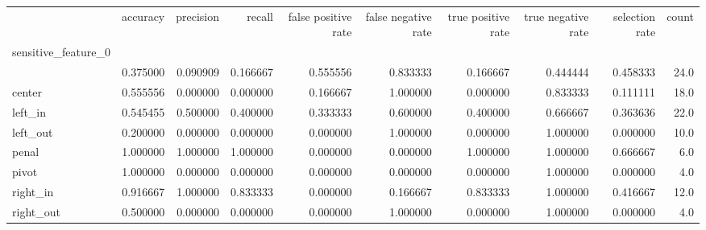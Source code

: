 \begin{tabular}{lrrrrrrrrr}
\toprule
{} &  accuracy &  precision &    recall &  false positive rate &  false negative rate &  true positive rate &  true negative rate &  selection rate &  count \\
sensitive\_feature\_0 &           &            &           &                      &                      &                     &                     &                 &        \\
\midrule
                    &  0.375000 &   0.090909 &  0.166667 &             0.555556 &             0.833333 &            0.166667 &            0.444444 &        0.458333 &   24.0 \\
center              &  0.555556 &   0.000000 &  0.000000 &             0.166667 &             1.000000 &            0.000000 &            0.833333 &        0.111111 &   18.0 \\
left\_in             &  0.545455 &   0.500000 &  0.400000 &             0.333333 &             0.600000 &            0.400000 &            0.666667 &        0.363636 &   22.0 \\
left\_out            &  0.200000 &   0.000000 &  0.000000 &             0.000000 &             1.000000 &            0.000000 &            1.000000 &        0.000000 &   10.0 \\
penal               &  1.000000 &   1.000000 &  1.000000 &             0.000000 &             0.000000 &            1.000000 &            1.000000 &        0.666667 &    6.0 \\
pivot               &  1.000000 &   0.000000 &  0.000000 &             0.000000 &             0.000000 &            0.000000 &            1.000000 &        0.000000 &    4.0 \\
right\_in            &  0.916667 &   1.000000 &  0.833333 &             0.000000 &             0.166667 &            0.833333 &            1.000000 &        0.416667 &   12.0 \\
right\_out           &  0.500000 &   0.000000 &  0.000000 &             0.000000 &             1.000000 &            0.000000 &            1.000000 &        0.000000 &    4.0 \\
\bottomrule
\end{tabular}
